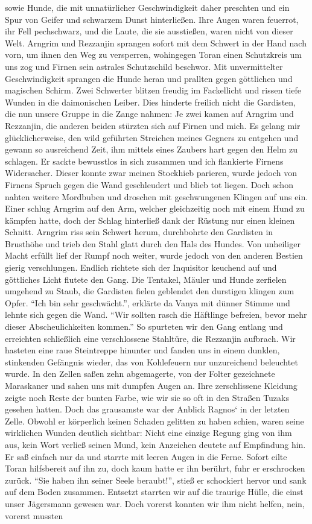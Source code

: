 sowie Hunde, die mit unnatürlicher Geschwindigkeit daher preschten und ein Spur von Geifer und schwarzem Dunst hinterließen. Ihre Augen waren feuerrot, ihr Fell pechschwarz, und die Laute, die sie ausstießen, waren nicht von dieser Welt. Arngrim und Rezzanjin sprangen sofort mit dem Schwert in der Hand nach vorn, um ihnen den Weg zu versperren, wohingegen Toran einen Schutzkreis um uns zog und Firnen sein astrales Schutzschild beschwor. Mit unvermittelter Geschwindigkeit sprangen die Hunde heran und prallten gegen göttlichen und magischen Schirm. Zwei Schwerter blitzen freudig im Fackellicht und rissen tiefe Wunden in die daimonischen Leiber. Dies hinderte freilich nicht die Gardisten, die nun unsere Gruppe in die Zange nahmen: Je zwei kamen auf Arngrim und Rezzanjin, die anderen beiden stürzten sich auf Firnen und mich. Es gelang mir glücklicherweise, den wild geführten Streichen meines Gegners zu entgehen und gewann so ausreichend Zeit, ihm mittels eines Zaubers hart gegen den Helm zu schlagen. Er sackte bewusstlos in sich zusammen und ich flankierte Firnens Widersacher. Dieser konnte zwar meinen Stockhieb parieren, wurde jedoch von Firnens Spruch gegen die Wand geschleudert und blieb tot liegen. Doch schon nahten weitere Mordbuben und droschen mit geschwungenen Klingen auf uns ein. Einer schlug Arngrim auf den Arm, welcher gleichzeitig noch mit einem Hund zu kämpfen hatte, doch der Schlag hinterließ dank der Rüstung nur einen kleinen Schnitt. Arngrim riss sein Schwert herum, durchbohrte den Gardisten in Brusthöhe und trieb den Stahl glatt durch den Hals des Hundes. Von unheiliger Macht erfüllt lief der Rumpf noch weiter, wurde jedoch von den anderen Bestien gierig verschlungen. Endlich richtete sich der Inquisitor keuchend auf und göttliches Licht flutete den Gang. Die Tentakel, Mäuler und Hunde zerfielen umgehend zu Staub, die Gardisten fielen geblendet den durstigen klingen zum Opfer. ``Ich bin sehr geschwächt.'', erklärte da Vanya mit dünner Stimme und lehnte sich gegen die Wand. ``Wir sollten rasch die Häftlinge befreien, bevor mehr dieser Abscheulichkeiten kommen.'' So spurteten wir den Gang entlang und erreichten schließlich eine verschlossene Stahltüre, die Rezzanjin aufbrach. Wir hasteten eine raue Steintreppe hinunter und fanden uns in einem dunklen, stinkenden Gefängnis wieder, das von Kohlefeuern nur unzureichend beleuchtet wurde. In den Zellen saßen zehn abgemagerte, von der Folter gezeichnete Maraskaner und sahen uns mit dumpfen Augen an. Ihre zerschlissene Kleidung zeigte noch Reste der bunten Farbe, wie wir sie so oft in den Straßen Tuzaks gesehen hatten. Doch das grausamste war der Anblick Ragnos‘ in der letzten Zelle. Obwohl er körperlich keinen Schaden gelitten zu haben schien, waren seine wirklichen Wunden deutlich sichtbar: Nicht eine einzige Regung ging von ihm aus, kein Wort verließ seinen Mund, kein Anzeichen deutete auf Empfindung hin. Er saß einfach nur da und starrte mit leeren Augen in die Ferne. Sofort eilte Toran hilfsbereit auf ihn zu, doch kaum hatte er ihn berührt, fuhr er erschrocken zurück. ``Sie haben ihn seiner Seele beraubt!'', stieß er schockiert hervor und sank auf dem Boden zusammen. Entsetzt starrten wir auf die traurige Hülle, die einst unser Jägersmann gewesen war. Doch vorerst konnten wir ihm nicht helfen, nein, vorerst mussten 